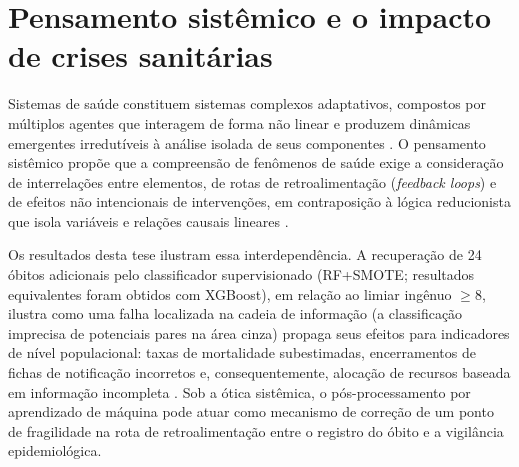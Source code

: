 

\section[Pensamento sistêmico e crises sanitárias]{Pensamento sistêmico e o impacto de crises sanitárias}\label{sec:pensamento-sistemico}

Sistemas de saúde constituem sistemas complexos adaptativos, compostos por múltiplos agentes que interagem de forma não linear e produzem dinâmicas emergentes irredutíveis à análise isolada de seus componentes \cite{Plsek2001complexity}. O pensamento sistêmico propõe que a compreensão de fenômenos de saúde exige a consideração de interrelações entre elementos, de rotas de retroalimentação (\textit{feedback loops}) e de efeitos não intencionais de intervenções, em contraposição à lógica reducionista que isola variáveis e relações causais lineares \cite{Sterman2000business, Luke2012systems}.

Os resultados desta tese ilustram essa interdependência. A recuperação de 24 óbitos adicionais pelo classificador supervisionado (RF+SMOTE; resultados equivalentes foram obtidos com XGBoost), em relação ao limiar ingênuo $\geq 8$, ilustra como uma falha localizada na cadeia de informação (a classificação imprecisa de potenciais pares na área cinza) propaga seus efeitos para indicadores de nível populacional: taxas de mortalidade subestimadas, encerramentos de fichas de notificação incorretos e, consequentemente, alocação de recursos baseada em informação incompleta \cite{Bartholomay2014improved, Lima2020tbquality}. Sob a ótica sistêmica, o pós-processamento por aprendizado de máquina pode atuar como mecanismo de correção de um ponto de fragilidade na rota de retroalimentação entre o registro do óbito e a vigilância epidemiológica.

